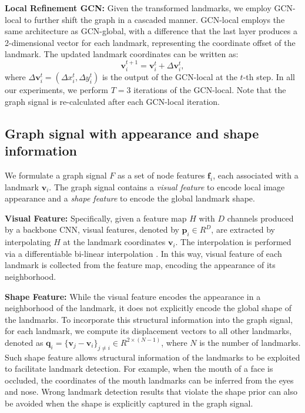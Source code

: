 \documentclass[runningheads]{llncs}
\begin{document}
\textbf{Local Refinement GCN:}
Given the transformed landmarks, we employ GCN-local to further shift the graph in a cascaded manner.
GCN-local employs the same architecture as GCN-global, with a difference that the last layer produces a 2-dimensional vector for each landmark, representing the coordinate offset of the landmark. The updated landmark coordinates can be written as:
\begin{equation}
	\mathbf{v}^{t+1}_i = \mathbf{v}^{t}_i + \Delta \mathbf{v}^{t}_i,
	\label{eq:step-shift}
\end{equation}
where $\Delta \mathbf{v}_i^{t}=(\Delta x_i^{t}, \Delta y_i^{t})$ is the output of the GCN-local at the $t$-th step. In all our experiments, we perform $T=3$ iterations of the GCN-local. Note that the graph signal is re-calculated after each GCN-local iteration. 



\subsection{Graph signal with appearance and shape information}
\label{subsec:graphsignal}

We formulate a graph signal $F$ as a set of node features $\mathbf{f}_i$, each associated with a landmark $\mathbf{v}_i$. The graph signal contains a \textit{visual feature} to encode local image appearance and a \textit{shape feature} to encode the global landmark shape. 

\textbf{Visual Feature:} Specifically, given a feature map $H$ with $D$ channels produced by a backbone CNN, visual features, denoted by $\mathbf{p}_i \in R^D$, are extracted by interpolating $H$ at the landmark coordinates $\mathbf{v}_i$. The interpolation is performed via a differentiable bi-linear interpolation \cite{jaderberg2015spatial}. In this way, visual feature of each landmark is collected from the feature map, encoding the appearance of its neighborhood.

\textbf{Shape Feature:} While the visual feature encodes the appearance in a neighborhood of the landmark, it does not explicitly encode the global shape of the landmarks. To incorporate this structural information into the graph signal, for each landmark, we compute its displacement vectors to all other landmarks, denoted as $\mathbf{q}_i = \{\mathbf{v}_j - \mathbf{v}_i\}_{j \neq i} \in R^{2 \times (N-1)}$, where $N$ is the number of landmarks. Such shape feature allows structural information of the landmarks to be exploited to facilitate landmark detection. For example, when the mouth of a face is occluded, the coordinates of the mouth landmarks can be inferred from the eyes and nose. Wrong landmark detection results that violate the shape prior can also be avoided when the shape is explicitly captured in the graph signal. 
\end{document}
